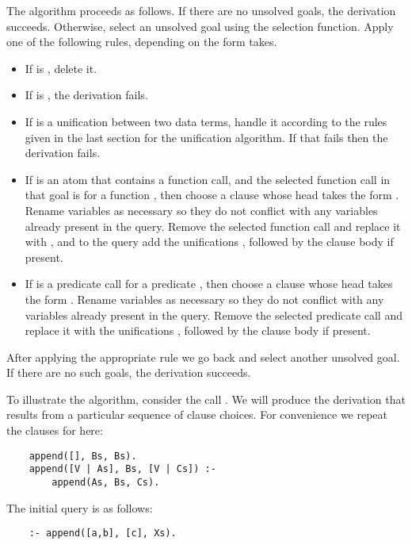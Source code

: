 The algorithm proceeds as follows.
If there are no unsolved goals, the derivation succeeds.
Otherwise, select an unsolved goal 
using the selection function.
Apply one of the following rules,
depending on the form  takes.
\begin{itemize}
\item
If  is ,
delete it.
\item
If  is ,
the derivation fails.
\item
If  is
a unification between two data terms,
handle it according to the rules
given in the last section
for the unification algorithm.
If that fails then the derivation fails.
\item
If  is an atom
that contains a function call,
and the selected function call in that goal is
 for a function ,
then choose a clause
whose head takes the form .
Rename variables as necessary so
they do not conflict with
any variables already present in the query.
Remove the selected function call
and replace it with ,
and to the query add
the unifications ,
followed by the clause body if present.
\item
If  is
a predicate call 
for a predicate ,
then choose a clause
whose head takes the form .
Rename variables as necessary so
they do not conflict with
any variables already present in the query.
Remove the selected predicate call
and replace it with
the unifications ,
followed by the clause body if present.
\end{itemize}
After applying the appropriate rule
we go back and select another unsolved goal.
If there are no such goals,
the derivation succeeds.

To illustrate the algorithm,
consider the call .
We will produce the derivation that results from
a particular sequence of clause choices.
For convenience we repeat the clauses for  here:
\begin{verbatim}
    append([], Bs, Bs).
    append([V | As], Bs, [V | Cs]) :-
        append(As, Bs, Cs).
\end{verbatim}
The initial query is as follows:
\begin{verbatim}
    :- append([a,b], [c], Xs).
\end{verbatim}

